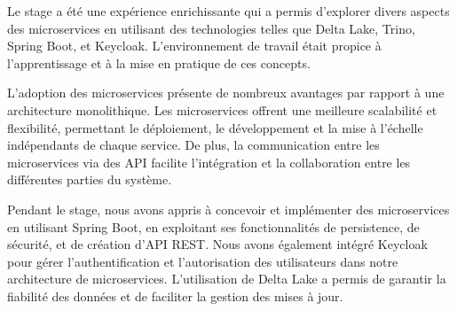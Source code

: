 \conclusion
Le stage a été une expérience enrichissante qui a permis d'explorer divers aspects des microservices en utilisant des technologies telles que Delta Lake, Trino, Spring Boot, et Keycloak. L'environnement de travail était propice à l'apprentissage et à la mise en pratique de ces concepts.

L'adoption des microservices présente de nombreux avantages par rapport à une architecture monolithique. Les microservices offrent une meilleure scalabilité et flexibilité, permettant le déploiement, le développement et la mise à l'échelle indépendants de chaque service. De plus, la communication entre les microservices via des API facilite l'intégration et la collaboration entre les différentes parties du système.

Pendant le stage, nous avons appris à concevoir et implémenter des microservices en utilisant Spring Boot, en exploitant ses fonctionnalités de persistence, de sécurité, et de création d'API REST. Nous avons également intégré Keycloak pour gérer l'authentification et l'autorisation des utilisateurs dans notre architecture de microservices. L'utilisation de Delta Lake a permis de garantir la fiabilité des données et de faciliter la gestion des mises à jour.